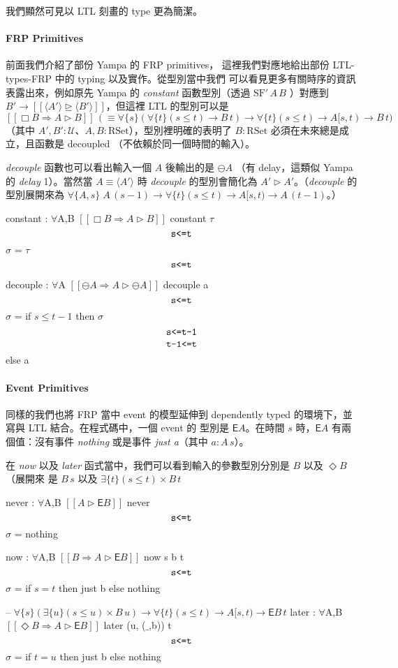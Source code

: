 \documentclass{article}
\newcommand{\llens}{[\![}
\newcommand{\rlens}{]\!]}
\newcommand{\TE}{\mathsf{E}}
\newcommand{\Wit}[1]{$\,\text{\texttt{#1}}\,$}
\newcommand{\U}{\mathcal{U}}
\newcommand{\Gt}{\tau}
\newcommand{\Gs}{\sigma}
\begin{document}
  我們顯然可見以 LTL 刻畫的 type 更為簡潔。

  \paragraph{FRP Primitives} 前面我們介紹了部份 Yampa 的 FRP primitives，
  這裡我們對應地給出部份 LTL-types-FRP 中的 typing 以及實作。從型別當中我們
  可以看見更多有關時序的資訊表露出來，例如原先 Yampa 的 \textit{constant}
  函數型別（透過 $\text{SF}'\,A\,B$ ）對應到$B'\to\llens \langle A'\rangle \unrhd \langle B'\rangle \rlens$，但這裡 LTL 的型別可以是 $\llens\Box B\Rightarrow A\rhd B\rlens\,(\equiv \forall\{s\}(\forall\{t\}(s\le t)\to B\,t)\to \forall\{t\}(s\le t)\to A[s,t)\to B\,t)$（其中 $A',B':\U$、$A,B:\text{RSet}$），型別裡明確的表明了 $B:\text{RSet}$ 必須在未來總是成立，且函數是
  decoupled （不依賴於同一個時間的輸入）。

  \textit{decouple} 函數也可以看出輸入一個 $A$ 後輸出的是 $\ominus A$
  （有 delay，這類似 Yampa 的 \textit{delay} 1）。當然當 $A\equiv\langle A'\rangle$ 時 \textit{decouple}
  的型別會簡化為 $A'\rhd A'$。（\textit{decouple} 的型別展開來為
  $\forall\{A,s\}\; A\,(s-1)\to \forall\{t\}(s\le t)\to A[s,t) \to A\,(t-1)$。）

  \begin{code}
  constant : $\forall${A,B} $\llens \Box B\Rightarrow A\rhd B\rlens$
  constant $\Gt$ $\Wit{s<=t}$ $\Gs$ = $\Gt$ $\Wit{s<=t}$

  decouple : $\forall${A} $\llens\ominus A\Rightarrow A\rhd \ominus A\rlens$
  decouple a $\Wit{s<=t}$ $\Gs$ = if $s\le t-1$ then $\Gs$ $\Wit{s<=t-1}$ $\Wit{t-1<=t}$ else a
  \end{code}
  \paragraph{Event Primitives} 同樣的我們也將 FRP 當中 event 的模型延伸到
  dependently typed 的環境下，並寫與 LTL 結合。在程式碼中，一個 event 的
  型別是 $\TE A$。在時間 $s$ 時，$\TE A$ 有兩個值：沒有事件 \textit{nothing}
  或是事件 \textit{just a}（其中 $a:A\,s$）。

  在 \textit{now} 以及 \textit{later} 函式當中，我們可以看到輸入的參數型別分別是 $B$ 以及 $\Diamond B$（展開來
  是 $B\,s$ 以及 $\exists \{t\} (s\le t)\times B\,t$

  \begin{code}
  never : $\forall${A,B} $\llens A\rhd \TE B\rlens$
  never $\Wit{s<=t}$ $\Gs$ = nothing

  now : $\forall${A,B} $\llens B\Rightarrow A\rhd\TE B\rlens$
  now {s} b {t} $\Wit{s<=t}$ $\Gs$ = if $s=t$ then just b else nothing

  -- $\forall\{s\} (\exists \{u\} (s\le u)\times B\,u) \to \forall\{t\}(s\le t)\to A[s,t)\to \TE B\, t$
  later : $\forall${A,B} $\llens \Diamond B\Rightarrow A\rhd\TE B\rlens$
  later ({u}, ($\_$,b)) {t} $\Wit{s<=t}$ $\Gs$ = if $t = u$ then just b else nothing
  \end{code}
\end{document}
